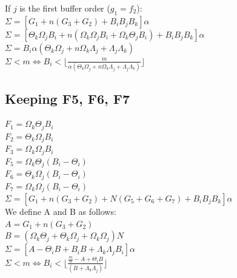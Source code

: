 \documentclass[conference]{IEEEtran}
\begin{document}
  If $j$ is the first buffer order ($g_1 =f_2$): \\
  $\Sigma = [G_1 + n(G_3 + G_2) + B_iB_jB_k]\alpha$ \\
  $\Sigma = [\Theta_k \Omega_j B_i + n (\Omega_k \Omega_j B_i + \Omega_k \Theta_j B_i) + B_iB_jB_k] \alpha$ \\
  $\Sigma = B_i \alpha (\Theta_k \Omega_j + n\Omega_k\Lambda_j + \Lambda_j \Lambda_k)$ \\
  $\Sigma < m \Leftrightarrow B_i < \lfloor \frac{m}{\alpha (\Theta_k \Omega_j + n\Omega_k\Lambda_j + \Lambda_j \Lambda_k)} \rfloor$

  \subsection{Keeping F5, F6, F7}
  \noindent $F_1 = \Omega_k \Theta_j B_i$ \\
  $F_2 = \Theta_k \Omega_j B_i$ \\
  $F_3 = \Omega_k \Omega_j B_i$ \\
  $F_5 = \Omega_k \Theta_j (B_i-\Theta_i)$ \\
  $F_6 = \Theta_k \Omega_j (B_i-\Theta_i)$ \\
  $F_7 = \Omega_k \Omega_j (B_i-\Theta_i)$ \\

  $\Sigma = [G_1 + n(G_3 + G_2) + N(G_5 + G_6 + G_7) + B_iB_jB_k]\alpha$ \\

  We define A and B as follows: \\
  $A = G_1 + n(G_3 + G_2)$ \\
  $B = (\Omega_k \Theta_j + \Theta_k \Omega_j + \Omega_k \Omega_j)N$ \\
  $\Sigma = [A - \Theta_iB + B_iB + \Lambda_k \Lambda_j B_i]\alpha$ \\
  $\Sigma < m \Leftrightarrow B_i < \lfloor \frac{\frac{m}{\alpha} - A + \Theta_iB}{(B + \Lambda_k\Lambda_j)} \rfloor$
\end{document}
